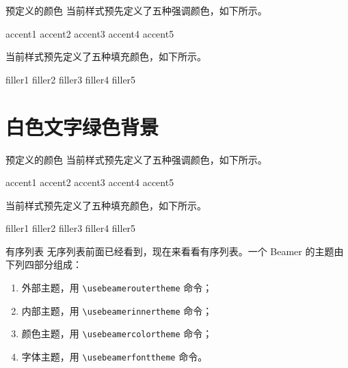 \documentclass[14pt,notheorems,xcolor={rgb}]{beamer}
\begin{document}
\begin{frame}{预定义的颜色}
当前样式预先定义了五种强调颜色，如下所示。
\begin{flushleft}
\textcolor{accent1}{accent1}
\textcolor{accent2}{accent2}
\textcolor{accent3}{accent3}
\textcolor{accent4}{accent4}
\textcolor{accent5}{accent5}
\end{flushleft}
当前样式预先定义了五种填充颜色，如下所示。
\begin{flushleft}
\colorbox{filler1}{filler1}
\colorbox{filler2}{filler2}
\colorbox{filler3}{filler3}
\colorbox{filler4}{filler4}
\colorbox{filler5}{filler5}
\end{flushleft}
\end{frame}


\begin{frame}[plain]\transboxout
\titlepage
\end{frame}

\section{白色文字绿色背景}

\begin{frame}{预定义的颜色}
当前样式预先定义了五种强调颜色，如下所示。
\begin{flushleft}
\textcolor{accent1}{accent1}
\textcolor{accent2}{accent2}
\textcolor{accent3}{accent3}
\textcolor{accent4}{accent4}
\textcolor{accent5}{accent5}
\end{flushleft}
当前样式预先定义了五种填充颜色，如下所示。
\begin{flushleft}
\colorbox{filler1}{filler1}
\colorbox{filler2}{filler2}
\colorbox{filler3}{filler3}
\colorbox{filler4}{filler4}
\colorbox{filler5}{filler5}
\end{flushleft}
\end{frame}

\begin{frame}[fragile]{有序列表}
无序列表前面已经看到，现在来看看有序列表。一个 Beamer 的主题由下列四部分组成：\pause
\begin{enumerate}[<+->]
\item 外部主题，用 \verb!\usebeameroutertheme! 命令；
\item 内部主题，用 \verb!\usebeamerinnertheme! 命令；
\item 颜色主题，用 \verb!\usebeamercolortheme! 命令；
\item 字体主题，用 \verb!\usebeamerfonttheme! 命令。
\end{enumerate}
\end{frame}
\end{document}
